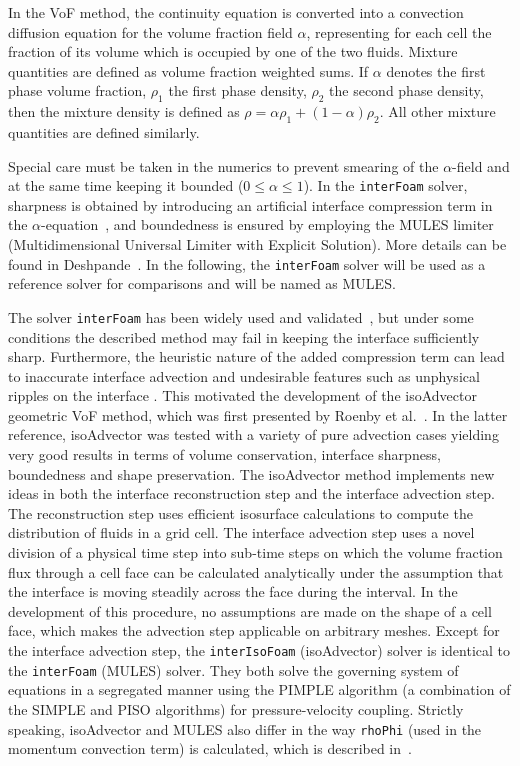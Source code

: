 \documentclass[review]{elsarticle}
\begin{document}
In the VoF method, the continuity equation is converted into a convection diffusion equation for the volume fraction field $\alpha$, representing for each cell the fraction of its volume which is occupied by one of the two fluids. Mixture quantities are defined as volume fraction weighted sums. If $\alpha$ denotes the first phase volume fraction, $\rho_1$ the first phase density, $\rho_2$ the second phase density, then the mixture density is defined as $\rho = \alpha\rho_1 + (1-\alpha)\rho_2$. All other mixture quantities are defined similarly.
 
Special care must be taken in the numerics to prevent smearing of the $\alpha$-field and at the same time keeping it bounded ($0\leq \alpha\leq 1$). In the \verb+interFoam+ solver, sharpness is obtained by introducing an artificial interface compression term in the $\alpha$-equation~\cite{Weller2008}, and boundedness is ensured by employing the MULES limiter (Multidimensional Universal Limiter with Explicit Solution). More details can be found in Deshpande~\cite{Deshpande2012}. In the following, the  \verb+interFoam+ solver will be used as a reference solver for comparisons and will be named as MULES.

The solver \verb+interFoam+ has been widely used and validated~\cite{MARSCHALL2012,RAEINI2012,HOANG2013,BILGER2017}, but under some conditions the described method may fail in keeping the interface sufficiently sharp. Furthermore, the heuristic nature of the added compression term can lead to inaccurate interface advection and undesirable features such as unphysical ripples on the interface \cite{roenby_new_2017,roenby_isoadvector:_2018}. This motivated the development of the isoAdvector geometric VoF method, which was first presented by Roenby et al.~\cite{Roenby160405}. In the latter reference, isoAdvector was tested with a variety of pure advection cases yielding very good results in terms of volume conservation, interface sharpness, boundedness and shape preservation.
The isoAdvector method implements new ideas in both the interface reconstruction step and the interface advection step. The reconstruction step uses efficient isosurface calculations to compute the distribution of fluids in a grid cell. The interface advection step uses a novel division of a physical time step into sub-time steps on which the volume fraction flux through a  cell face can be calculated analytically under the assumption that the interface is moving steadily across the face during the interval. In the development of this procedure, no assumptions are made on the shape of a cell face, which makes the advection step applicable on arbitrary meshes.
Except for the interface advection step, the \verb+interIsoFoam+ (isoAdvector) solver is identical to the \verb+interFoam+ (MULES) solver. They both solve the governing system of equations in a segregated manner using the PIMPLE algorithm (a combination of the SIMPLE and PISO algorithms) for pressure-velocity coupling. Strictly speaking, isoAdvector and MULES also differ in the way \verb+rhoPhi+ (used in the momentum convection term) is calculated, which is described in~\cite{roenby_isoadvector:_2018}.
 
\end{document}
